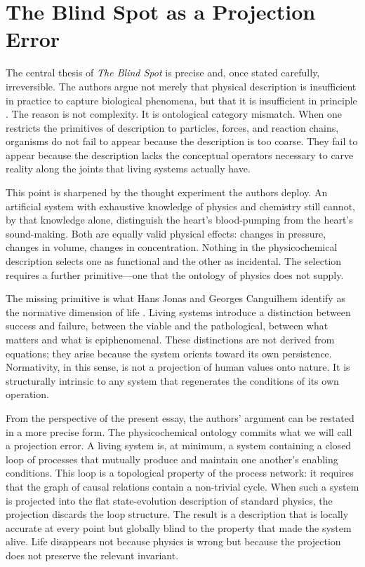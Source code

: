\documentclass[11pt, a4paper]{article}
\theoremstyle{plain}
\theoremstyle{definition}
\theoremstyle{remark}
\begin{document}
\section{The Blind Spot as a Projection Error}

The central thesis of \emph{The Blind Spot} is precise and, once stated carefully, irreversible. The authors argue not merely that physical description is insufficient in practice to capture biological phenomena, but that it is insufficient in principle \cite{frank2025blind}. The reason is not complexity. It is ontological category mismatch. When one restricts the primitives of description to particles, forces, and reaction chains, organisms do not fail to appear because the description is too coarse. They fail to appear because the description lacks the conceptual operators necessary to carve reality along the joints that living systems actually have.

This point is sharpened by the thought experiment the authors deploy. An artificial system with exhaustive knowledge of physics and chemistry still cannot, by that knowledge alone, distinguish the heart's blood-pumping from the heart's sound-making. Both are equally valid physical effects: changes in pressure, changes in volume, changes in concentration. Nothing in the physicochemical description selects one as functional and the other as incidental. The selection requires a further primitive---one that the ontology of physics does not supply.

The missing primitive is what Hans Jonas and Georges Canguilhem identify as the normative dimension of life \cite{jonas1966, canguilhem1991}. Living systems introduce a distinction between success and failure, between the viable and the pathological, between what matters and what is epiphenomenal. These distinctions are not derived from equations; they arise because the system orients toward its own persistence. Normativity, in this sense, is not a projection of human values onto nature. It is structurally intrinsic to any system that regenerates the conditions of its own operation.

From the perspective of the present essay, the authors' argument can be restated in a more precise form. The physicochemical ontology commits what we will call a projection error. A living system is, at minimum, a system containing a closed loop of processes that mutually produce and maintain one another's enabling conditions. This loop is a topological property of the process network: it requires that the graph of causal relations contain a non-trivial cycle. When such a system is projected into the flat state-evolution description of standard physics, the projection discards the loop structure. The result is a description that is locally accurate at every point but globally blind to the property that made the system alive. Life disappears not because physics is wrong but because the projection does not preserve the relevant invariant.
\end{document}
